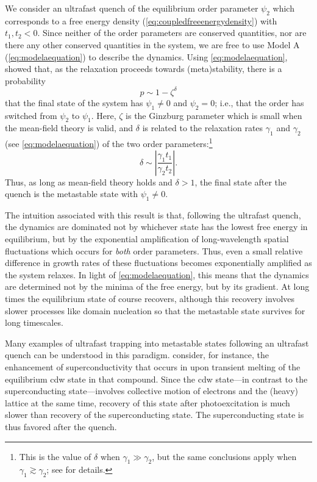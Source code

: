 We consider an ultrafast quench of the equilibrium order parameter $\psi_2$ which corresponds to a free energy density (\cref{eq:coupledfreeenergydensity}) with $t_1,t_2<0$.
Since neither of the order parameters are conserved quantities, nor are there any other conserved quantities in the system, we are free to use Model A (\cref{eq:modelaequation}) to describe the dynamics.
Using \cref{eq:modelaequation}, \citet{sun_transient_2020} showed that, as the relaxation proceeds towards (meta)stability, there is a probability
\begin{equation}
p\sim 1-\zeta^\delta
\end{equation}
that the final state of the system has $\psi_1\neq 0$ and $\psi_2 = 0$; i.e., that the order has switched from $\psi_2$ to $\psi_1$.
Here, $\zeta$ is the Ginzburg parameter which is small when the mean-field theory is valid, and $\delta$ is related to the relaxation rates $\gamma_1$ and $\gamma_2$ (see \cref{eq:modelaequation}) of the two order parameters:\footnote{This is the value of $\delta$ when $\gamma_1 \gg \gamma_2$, but the same conclusions apply when $\gamma_1 \gtrsim \gamma_2$; see \citet{sun_transient_2020} for details.}
\begin{equation}\label{eq:sunandmillisdelta}
\delta\sim \left|\frac{\gamma_1 t_1}{\gamma_2 t_2}\right|.
\end{equation}
Thus, as long as mean-field theory holds and $\delta > 1$, the final state after the quench is the metastable state with $\psi_1\neq 0$. 

The intuition associated with this result is that, following the ultrafast quench, the dynamics are dominated not by whichever state has the lowest free energy in equilibrium, but by the exponential amplification of long-wavelength spatial fluctuations which occurs for \emph{both} order parameters.
Thus, even a small relative difference in growth rates of these fluctuations becomes exponentially amplified as the system relaxes.
In light of \cref{eq:modelaequation}, this means that the dynamics are determined not by the minima of the free energy, but by its gradient.
At long times the equilibrium state of course recovers, although this recovery involves slower processes like domain nucleation so that the metastable state survives for long timescales.

Many examples of ultrafast trapping into metastable states following an ultrafast quench can be understood in this paradigm.
\citet{sun_transient_2020} consider, for instance, the enhancement of superconductivity that occurs in  upon transient melting of the equilibrium \gls{cdw} state in that compound\citep{fausti_light-induced_2011}.
Since the \gls{cdw} state---in contrast to the superconducting state---involves collective motion of electrons and the (heavy) lattice at the same time, recovery of this state after photoexcitation is much slower than recovery of the superconducting state.
The superconducting state is thus favored after the quench.

